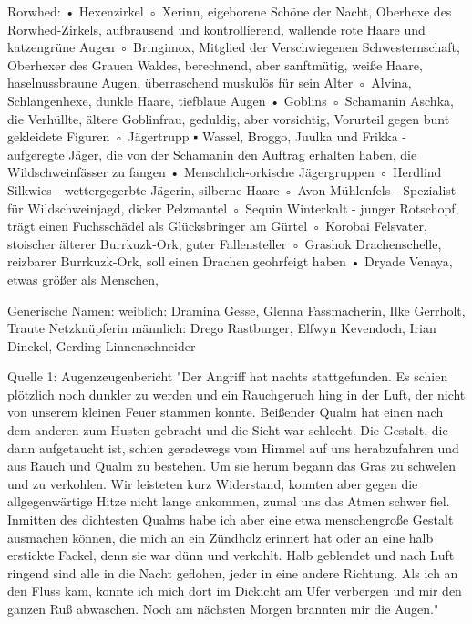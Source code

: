 Rorwhed:
    • Hexenzirkel
        ◦ Xerinn, eigeborene Schöne der Nacht, Oberhexe des Rorwhed-Zirkels, aufbrausend und kontrollierend, wallende rote Haare und katzengrüne Augen
        ◦ Bringimox, Mitglied der Verschwiegenen Schwesternschaft, Oberhexer des Grauen Waldes, berechnend, aber sanftmütig, weiße Haare, haselnussbraune Augen, überraschend muskulös für sein Alter
        ◦ Alvina, Schlangenhexe, dunkle Haare, tiefblaue Augen
    • Goblins
        ◦ Schamanin Aschka, die Verhüllte, ältere Goblinfrau, geduldig, aber vorsichtig, Vorurteil gegen bunt gekleidete Figuren
        ◦ Jägertrupp
            ▪ Wassel, Broggo, Juulka und Frikka - aufgeregte Jäger, die von der Schamanin den Auftrag erhalten haben, die Wildschweinfässer zu fangen
    • Menschlich-orkische Jägergruppen
        ◦ Herdlind Silkwies - wettergegerbte Jägerin, silberne Haare
        ◦ Avon Mühlenfels - Spezialist für Wildschweinjagd, dicker Pelzmantel
        ◦ Sequin Winterkalt - junger Rotschopf, trägt einen Fuchsschädel als Glücksbringer am Gürtel
        ◦ Korobai Felsvater, stoischer älterer Burrkuzk-Ork, guter Fallensteller
        ◦ Grashok Drachenschelle, reizbarer Burrkuzk-Ork, soll einen Drachen geohrfeigt haben
    • Dryade Venaya, etwas größer als Menschen, 

Generische Namen:
weiblich: 
Dramina Gesse, Glenna Fassmacherin, Ilke Gerrholt, Traute Netzknüpferin 
männlich:
Drego Rastburger, Elfwyn Kevendoch, Irian Dinckel, Gerding Linnenschneider


Quelle 1: Augenzeugenbericht
"Der Angriff hat nachts stattgefunden. Es schien plötzlich noch dunkler zu werden und ein Rauchgeruch hing in der Luft, der nicht von unserem kleinen Feuer stammen konnte. Beißender Qualm hat einen nach dem anderen zum Husten gebracht und die Sicht war schlecht. Die Gestalt, die dann aufgetaucht ist, schien geradewegs vom Himmel auf uns herabzufahren und aus Rauch und Qualm zu bestehen. Um sie herum begann das Gras zu schwelen und zu verkohlen. Wir leisteten kurz Widerstand, konnten aber gegen die allgegenwärtige Hitze nicht lange ankommen, zumal uns das Atmen schwer fiel. Inmitten des dichtesten Qualms habe ich aber eine etwa menschengroße Gestalt ausmachen können, die mich an ein Zündholz erinnert hat oder an eine halb erstickte Fackel, denn sie war dünn und verkohlt. Halb geblendet und nach Luft ringend sind alle in die Nacht geflohen, jeder in eine andere Richtung. Als ich an den Fluss kam, konnte ich mich dort im Dickicht am Ufer verbergen und mir den ganzen Ruß abwaschen. Noch am nächsten Morgen brannten mir die Augen."



